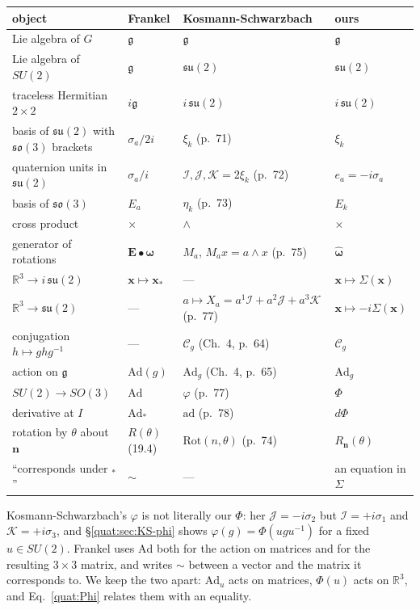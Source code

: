 \begin{center}
\small
\begin{tabular}{llll}
 object & Frankel \cite{TFrankel2012} &
   Kosmann-Schwarzbach \cite{dgdt:YKosmann-Schwarzbach2010} & ours\\\hline
 Lie algebra of $G$ & $\mathfrak g$ & $\mathfrak g$ & $\mathfrak g$\\
 Lie algebra of $SU(2)$ & $\mathfrak g$ & $\mathfrak{su}(2)$ &
   $\mathfrak{su}(2)$\\
 traceless Hermitian $2\times2$ & $i\mathfrak g$ & $i\,\mathfrak{su}(2)$ &
   $i\,\mathfrak{su}(2)$\\
 basis of $\mathfrak{su}(2)$ with $\mathfrak{so}(3)$ brackets &
   $\sigma_a/2i$ & $\xi_k$ (p.~71) & $\xi_k$\\
 quaternion units in $\mathfrak{su}(2)$ & $\sigma_a/i$ &
   $\mathcal I,\mathcal J,\mathcal K=2\xi_k$ (p.~72) & $e_a=-i\sigma_a$\\
 basis of $\mathfrak{so}(3)$ & $E_a$ & $\eta_k$ (p.~73) & $E_k$\\
 cross product & $\times$ & $\wedge$ & $\times$\\
 generator of rotations & $\mathbf E\bullet\boldsymbol\omega$ &
   $M_a$, $M_ax=a\wedge x$ (p.~75) & $\widehat{\boldsymbol\omega}$\\
 $\mathbb R^3\to i\,\mathfrak{su}(2)$ & $\mathbf x\mapsto\mathbf x_*$ &
   --- & $\mathbf x\mapsto\Sigma(\mathbf x)$\\
 $\mathbb R^3\to\mathfrak{su}(2)$ & --- &
   $a\mapsto X_a=a^1\mathcal I+a^2\mathcal J+a^3\mathcal K$ (p.~77) &
   $\mathbf x\mapsto-i\Sigma(\mathbf x)$\\
 conjugation $h\mapsto ghg^{-1}$ & --- & $\mathcal C_g$ (Ch.~4, p.~64) &
   $\mathcal C_g$\\
 action on $\mathfrak g$ & $\mathrm{Ad}(g)$ & $\mathrm{Ad}_g$ (Ch.~4, p.~65) &
   $\mathrm{Ad}_g$\\
 $SU(2)\to SO(3)$ & $\mathrm{Ad}$ & $\varphi$ (p.~77) & $\Phi$\\
 derivative at $I$ & $\mathrm{Ad}_*$ & $\mathrm{ad}$ (p.~78) & $d\Phi$\\
 rotation by $\theta$ about $\mathbf n$ & $R(\theta)$ (19.4) &
   $\mathrm{Rot}(n,\theta)$ (p.~74) & $R_{\mathbf n}(\theta)$\\
 ``corresponds under $_*$'' & $\sim$ & --- & an equation in $\Sigma$
\end{tabular}
\end{center}
Kosmann-Schwarzbach's $\varphi$ is not literally our $\Phi$: her
$\mathcal J=-i\sigma_2$ but $\mathcal I=+i\sigma_1$ and $\mathcal K=+i\sigma_3$,
and \S\ref{quat:sec:KS-phi} shows $\varphi(g)=\Phi(ugu^{-1})$ for a fixed
$u\in SU(2)$.
Frankel uses $\mathrm{Ad}$ both for the action on matrices and for the
resulting $3\times3$ matrix, and writes $\sim$ between a vector and the
matrix it corresponds to. We keep the two apart: $\mathrm{Ad}_u$ acts on
matrices, $\Phi(u)$ acts on $\mathbb R^3$, and Eq.~\eqref{quat:Phi} relates
them with an equality.

